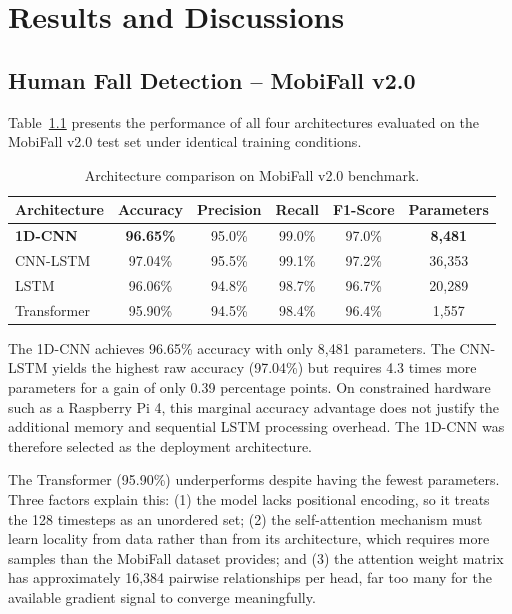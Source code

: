 \chapter{Results and Discussions}
\label{sec:4}

\section{Human Fall Detection -- MobiFall v2.0}
\label{sec:results_fall}

Table~\ref{tab:model_comparison} presents the performance of all four architectures evaluated on the MobiFall v2.0 test set under identical training conditions.

\begin{table}[h!]
    \centering\small
    \renewcommand{\arraystretch}{1.3}
    \caption{Architecture comparison on MobiFall v2.0 benchmark.}
    \label{tab:model_comparison}
    \begin{tabular}{|l|c|c|c|c|c|}
        \hline
        \textbf{Architecture} & \textbf{Accuracy} & \textbf{Precision} & \textbf{Recall} & \textbf{F1-Score} & \textbf{Parameters} \\ \hline
        \textbf{1D-CNN} & \textbf{96.65\%} & 95.0\% & 99.0\% & 97.0\% & \textbf{8,481} \\ \hline
        CNN-LSTM        & 97.04\%          & 95.5\% & 99.1\% & 97.2\% & 36,353 \\ \hline
        LSTM            & 96.06\%          & 94.8\% & 98.7\% & 96.7\% & 20,289 \\ \hline
        Transformer     & 95.90\%          & 94.5\% & 98.4\% & 96.4\% & 1,557  \\ \hline
    \end{tabular}
\end{table}

The 1D-CNN achieves 96.65\% accuracy with only 8,481 parameters. The CNN-LSTM yields the highest raw accuracy (97.04\%) but requires 4.3 times more parameters for a gain of only 0.39 percentage points. On constrained hardware such as a Raspberry Pi 4, this marginal accuracy advantage does not justify the additional memory and sequential LSTM processing overhead. The 1D-CNN was therefore selected as the deployment architecture.

The Transformer (95.90\%) underperforms despite having the fewest parameters. Three factors explain this: (1) the model lacks positional encoding, so it treats the 128 timesteps as an unordered set; (2) the self-attention mechanism must learn locality from data rather than from its architecture, which requires more samples than the MobiFall dataset provides; and (3) the attention weight matrix has approximately 16,384 pairwise relationships per head, far too many for the available gradient signal to converge meaningfully.

